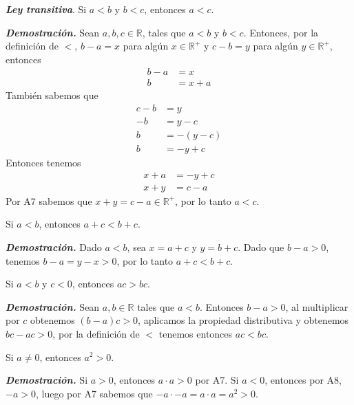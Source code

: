 \documentclass{report}
\begin{document}
    \begin{thBox}
        \textit{\textbf{Ley transitiva}}. Si $a<b$ y $b<c$, entonces $a<c$.
    \end{thBox}
    
    \textit{\textbf{Demostración.}} Sean $a,b,c \in \mathbb{R}$, tales que $a<b$ y $b<c$. Entonces, por la definición de $<$, $b-a = x$ para algún $x\in \mathbb{R}^+$ y $c-b=y$ para algún $y \in \mathbb{R}^+$, entonces
    \begin{align*}
        b-a &= x\\
        b &= x+a
    \end{align*}
    También sabemos que
    \begin{align*}
        c-b &= y\\
        -b &= y-c\\
        b &= -(y-c)\\
        b &= -y + c
    \end{align*}
    Entonces tenemos
    \begin{align*}
        x+a &= -y+c\\
        x+y &= c-a
    \end{align*}
    Por A7 sabemos que $x+y = c-a \in \mathbb{R}^+$, por lo tanto $a<c$.\\
    
    \begin{thBox}
        Si $a<b$, entonces $a+c<b+c$.
    \end{thBox}
    \textbf{\textit{Demostración.}} Dado \(a < b\), sea \(x = a + c\) y \(y = b + c\). Dado que \(b - a > 0\), tenemos \(b - a = y - x > 0\), por lo tanto $a+c < b+c$.\\
    
    \begin{thBox}
        Si $a<b$ y $c<0$, entonces $ac>bc$.
    \end{thBox}
    \textit{\textbf{Demostración.}} Sean $a,b \in \mathbb{R}$ tales que $a<b$. Entonces $b-a>0$, al multiplicar por $c$ obtenemos $(b-a)c > 0$, aplicamos la propiedad distributiva y obtenemos $bc-ac >0$, por la definición de $<$ tenemos entonces $ac<bc$.\\
    
    \begin{thBox}
        Si $a \neq 0$, entonces $a^2 > 0$.
    \end{thBox}
    \textit{\textbf{Demostración.}} Si $a>0$, entonces $a \cdot a > 0$ por A7. Si $a<0$, entonces por A8, $-a >0$, luego por A7 sabemos que $-a \cdot -a = a \cdot a = a^2 > 0$.\\
    
\end{document}
